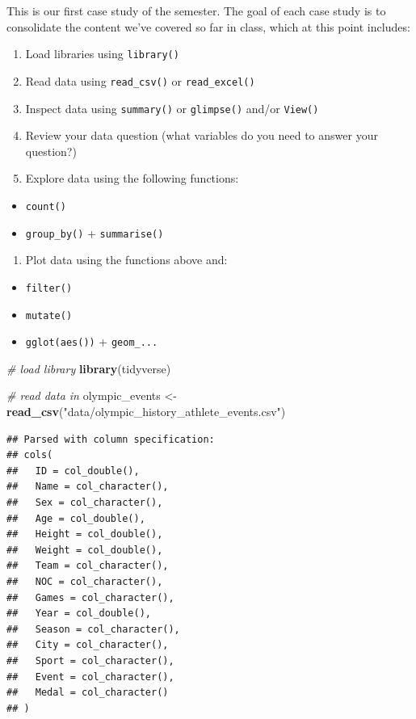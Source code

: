 \documentclass[
]{book}
\newenvironment{Shaded}{\begin{snugshade}}{\end{snugshade}}
\newcommand{\CommentTok}[1]{\textcolor[rgb]{0.56,0.35,0.01}{\textit{#1}}}
\newcommand{\KeywordTok}[1]{\textcolor[rgb]{0.13,0.29,0.53}{\textbf{#1}}}
\newcommand{\NormalTok}[1]{#1}
\newcommand{\StringTok}[1]{\textcolor[rgb]{0.31,0.60,0.02}{#1}}
\providecommand{\tightlist}{%
  \setlength{\itemsep}{0pt}\setlength{\parskip}{0pt}}
\begin{document}
This is our first case study of the semester. The goal of each case study is to consolidate the content we've covered so far in class, which at this point includes:

\begin{enumerate}
\def\labelenumi{\arabic{enumi}.}
\item
  Load libraries using \texttt{library()}
\item
  Read data using \texttt{read\_csv()} or \texttt{read\_excel()}
\item
  Inspect data using \texttt{summary()} or \texttt{glimpse()} and/or \texttt{View()}
\item
  Review your data question (what variables do you need to answer your question?)
\item
  Explore data using the following functions:
\end{enumerate}

\begin{itemize}
\item
  \texttt{count()}
\item
  \texttt{group\_by()} + \texttt{summarise()}
\end{itemize}

\begin{enumerate}
\def\labelenumi{\arabic{enumi}.}
\setcounter{enumi}{5}
\tightlist
\item
  Plot data using the functions above and:
\end{enumerate}

\begin{itemize}
\item
  \texttt{filter()}
\item
  \texttt{mutate()}
\item
  \texttt{gglot(aes())} + \texttt{geom\_...}
\end{itemize}

\begin{Shaded}
\begin{Highlighting}[]
\CommentTok{# load library}
\KeywordTok{library}\NormalTok{(tidyverse)}

\CommentTok{# read data in}
\NormalTok{olympic_events <-}\StringTok{ }\KeywordTok{read_csv}\NormalTok{(}\StringTok{"data/olympic_history_athlete_events.csv"}\NormalTok{)}
\end{Highlighting}
\end{Shaded}

\begin{verbatim}
## Parsed with column specification:
## cols(
##   ID = col_double(),
##   Name = col_character(),
##   Sex = col_character(),
##   Age = col_double(),
##   Height = col_double(),
##   Weight = col_double(),
##   Team = col_character(),
##   NOC = col_character(),
##   Games = col_character(),
##   Year = col_double(),
##   Season = col_character(),
##   City = col_character(),
##   Sport = col_character(),
##   Event = col_character(),
##   Medal = col_character()
## )
\end{verbatim}
\end{document}
